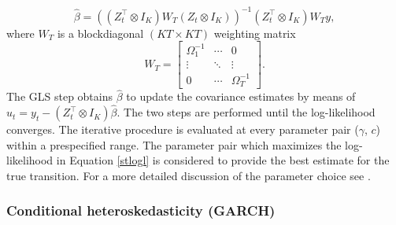 \documentclass[nojss]{jss}\usepackage[]{graphicx}\usepackage[]{color}
\begin{document}
$$
\widehat{\beta} = \left((Z_t^\top \otimes I_K)W_T(Z_t \otimes I_K)\right)^{-1}(Z_t^\top \otimes I_K)W_Ty,
$$
where $W_T$ is a blockdiagonal $(KT \times KT)$ weighting matrix
$$
W_T =
\begin{bmatrix}
\Omega^{-1}_1 & \cdots & 0 \\
\vdots & \ddots & \vdots \\
0 & \cdots & \Omega^{-1}_T
\end{bmatrix}.
$$
The GLS step obtains $\widehat{\beta}$ to update the covariance estimates by means of $\widehat{u}_t = y_t - (Z_t^\top \otimes I_K)\widehat{\beta}$. The two steps are performed until  the log-likelihood converges. The iterative procedure is evaluated at every parameter pair ($\gamma$, $c$) within a prespecified range. The parameter pair which maximizes the log-likelihood in Equation \ref{stlogl} is considered to provide the best estimate for the true transition. For a more detailed discussion of the parameter choice see \cite{LUTKEPOHL201743}.

\subsubsection{Conditional heteroskedasticity (GARCH)}
\end{document}
